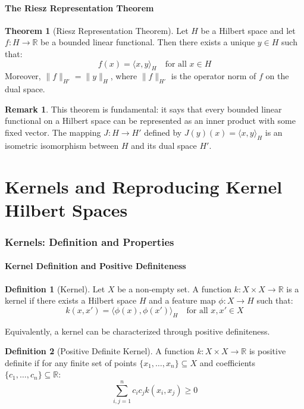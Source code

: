 \documentclass[12pt,a4paper]{article}
\theoremstyle{definition}
\newtheorem{definition}{Definition}[section]
\newtheorem{theorem}{Theorem}[section]
\newtheorem{remark}{Remark}[section]
\begin{document}
\subsection{The Riesz Representation Theorem}

\begin{theorem}[Riesz Representation Theorem]
Let $H$ be a Hilbert space and let $f : H \to \mathbb{R}$ be a bounded linear functional. Then there exists a unique $y \in H$ such that:
\[
f(x) = \langle x, y \rangle_H \quad \text{for all } x \in H
\]
Moreover, $\|f\|_{H'} = \|y\|_H$, where $\|f\|_{H'}$ is the operator norm of $f$ on the dual space.
\end{theorem}

\begin{remark}
This theorem is fundamental: it says that every bounded linear functional on a Hilbert space can be represented as an inner product with some fixed vector. The mapping $J: H \to H'$ defined by $J(y)(x) = \langle x, y \rangle_H$ is an isometric isomorphism between $H$ and its dual space $H'$.
\end{remark}

\newpage
\part{Kernels and Reproducing Kernel Hilbert Spaces}

\section{Kernels: Definition and Properties}

\subsection{Kernel Definition and Positive Definiteness}

\begin{definition}[Kernel]
Let $X$ be a non-empty set. A function $k : X \times X \to \mathbb{R}$ is a kernel if there exists a Hilbert space $H$ and a feature map $\phi : X \to H$ such that:
\[
k(x, x') = \langle \phi(x), \phi(x') \rangle_H \quad \text{for all } x, x' \in X
\]
\end{definition}

Equivalently, a kernel can be characterized through positive definiteness.

\begin{definition}[Positive Definite Kernel]
A function $k : X \times X \to \mathbb{R}$ is positive definite if for any finite set of points $\{x_1, \ldots, x_n\} \subseteq X$ and coefficients $\{c_1, \ldots, c_n\} \subseteq \mathbb{R}$:
\[
\sum_{i,j=1}^{n} c_i c_j k(x_i, x_j) \geq 0
\]
\end{definition}
\end{document}
